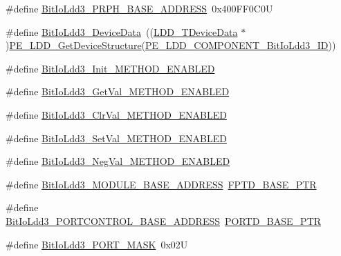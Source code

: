 \begin{DoxyCompactItemize}
\item 
\#define \hyperlink{group___bit_io_ldd3__module_ga2cf3db9aac2730f64ec146f0b923f778}{Bit\+Io\+Ldd3\+\_\+\+P\+R\+P\+H\+\_\+\+B\+A\+S\+E\+\_\+\+A\+D\+D\+R\+E\+SS}~0x400\+F\+F0\+C0U
\item 
\#define \hyperlink{group___bit_io_ldd3__module_ga6c42610f82c903df15f7a2a286e3dae4}{Bit\+Io\+Ldd3\+\_\+\+Device\+Data}~((\hyperlink{group___p_e___types__module_gac5cf1362f1f0e3a2ce71b1bf2276d091}{L\+D\+D\+\_\+\+T\+Device\+Data} $\ast$)\hyperlink{group___p_e___types__module_gaa1c23d559daef5bcd3327ca83fb56f5a}{P\+E\+\_\+\+L\+D\+D\+\_\+\+Get\+Device\+Structure}(\hyperlink{group___p_e___types__module_ga3363bf6b002e650de7e2e03beced3682}{P\+E\+\_\+\+L\+D\+D\+\_\+\+C\+O\+M\+P\+O\+N\+E\+N\+T\+\_\+\+Bit\+Io\+Ldd3\+\_\+\+ID}))
\item 
\#define \hyperlink{group___bit_io_ldd3__module_ga081e20c8147bdc4089dd42bfe0043aaf}{Bit\+Io\+Ldd3\+\_\+\+Init\+\_\+\+M\+E\+T\+H\+O\+D\+\_\+\+E\+N\+A\+B\+L\+ED}
\item 
\#define \hyperlink{group___bit_io_ldd3__module_ga4d7ef868562eca24f6c7f305c72eb969}{Bit\+Io\+Ldd3\+\_\+\+Get\+Val\+\_\+\+M\+E\+T\+H\+O\+D\+\_\+\+E\+N\+A\+B\+L\+ED}
\item 
\#define \hyperlink{group___bit_io_ldd3__module_ga571fcfe991c653c303926e95b884c718}{Bit\+Io\+Ldd3\+\_\+\+Clr\+Val\+\_\+\+M\+E\+T\+H\+O\+D\+\_\+\+E\+N\+A\+B\+L\+ED}
\item 
\#define \hyperlink{group___bit_io_ldd3__module_ga8dc01519faed95a98b47497a7d6dcdb9}{Bit\+Io\+Ldd3\+\_\+\+Set\+Val\+\_\+\+M\+E\+T\+H\+O\+D\+\_\+\+E\+N\+A\+B\+L\+ED}
\item 
\#define \hyperlink{group___bit_io_ldd3__module_gab39337d26502f9534bb021f6dba6ac30}{Bit\+Io\+Ldd3\+\_\+\+Neg\+Val\+\_\+\+M\+E\+T\+H\+O\+D\+\_\+\+E\+N\+A\+B\+L\+ED}
\item 
\#define \hyperlink{group___bit_io_ldd3__module_ga3f97b8873d6ac636560bbf2f8486adcf}{Bit\+Io\+Ldd3\+\_\+\+M\+O\+D\+U\+L\+E\+\_\+\+B\+A\+S\+E\+\_\+\+A\+D\+D\+R\+E\+SS}~\hyperlink{group___backward___compatibility___symbols_gabaff6b055edb9ba703415d0473b92ca8}{F\+P\+T\+D\+\_\+\+B\+A\+S\+E\+\_\+\+P\+TR}
\item 
\#define \hyperlink{group___bit_io_ldd3__module_gaa8205de08f47e3449366f271aa53b0da}{Bit\+Io\+Ldd3\+\_\+\+P\+O\+R\+T\+C\+O\+N\+T\+R\+O\+L\+\_\+\+B\+A\+S\+E\+\_\+\+A\+D\+D\+R\+E\+SS}~\hyperlink{group___p_o_r_t___peripheral_ga7f5a263751543810ebfdbde278383276}{P\+O\+R\+T\+D\+\_\+\+B\+A\+S\+E\+\_\+\+P\+TR}
\item 
\#define \hyperlink{group___bit_io_ldd3__module_ga7dc6d572b529a6f8df8ea6ee6610ddef}{Bit\+Io\+Ldd3\+\_\+\+P\+O\+R\+T\+\_\+\+M\+A\+SK}~0x02U
\end{DoxyCompactItemize}
